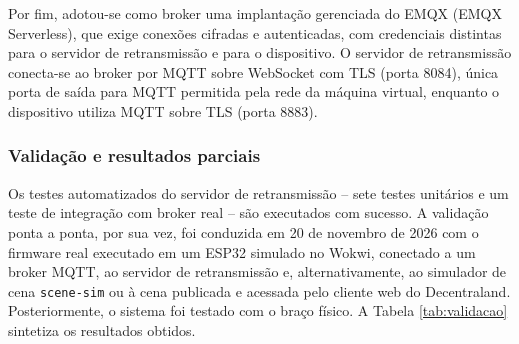 \documentclass[12pt]{article}
\begin{document}
Por fim, adotou-se como broker uma implantação gerenciada do EMQX (EMQX Serverless), que exige conexões cifradas e autenticadas, com credenciais distintas para o servidor de retransmissão e para o dispositivo. O servidor de retransmissão conecta-se ao broker por MQTT sobre WebSocket com TLS (porta 8084), única porta de saída para MQTT permitida pela rede da máquina virtual, enquanto o dispositivo utiliza MQTT sobre TLS (porta 8883).

\subsubsection{Validação e resultados parciais}
\label{subsec:validacao}

Os testes automatizados do servidor de retransmissão -- sete testes unitários e um teste de integração com broker real -- são executados com sucesso. A validação ponta a ponta, por sua vez, foi conduzida em 20 de novembro de 2026 com o firmware real executado em um ESP32 simulado no Wokwi, conectado a um broker MQTT, ao servidor de retransmissão e, alternativamente, ao simulador de cena \texttt{scene-sim} ou à cena publicada e acessada pelo cliente web do Decentraland. Posteriormente, o sistema foi testado com o braço físico. A Tabela \ref{tab:validacao} sintetiza os resultados obtidos.
\end{document}
